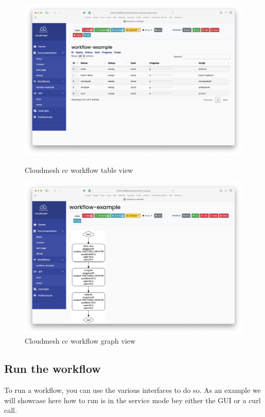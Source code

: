 \begin{figure}[htb]
{\centering
\includegraphics[width=1.05\columnwidth]{images/service-table.png}}
\caption{Cloudmesh cc workflow table view}\label{fig:table}

{\includegraphics[width=1.05\columnwidth]{images/service-graph.png}
  \caption{Cloudmesh cc workflow graph view}}
\label{fig:graph}
\end{figure}



\subsection{Run the workflow}\label{run-the-workflow}

To run a workflow, you can use the various interfaces to do so. As an
example we will showcase here how to run is in the service mode bey
either the GUI or a curl call.

